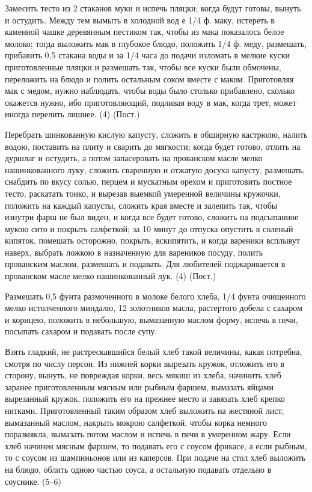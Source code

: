 
Замесить тесто из 2 стаканов муки и испечь пляцки; когда будут готовы, вынуть и остудить. Между тем вымыть в холодной вод е 1/4 ф. маку, истереть в каменной чашке деревянным пестиком так, чтобы из мака показалось белое молоко; тогда выложить мак в глубокое блюдо, положить 1/4 ф. меду, размешать, прибавить 0,5 стакана воды и за 1/4 часа до подачи изломать в мелкие куски приготовленные пляцки и размешать так, чтобы все куски были обмочены, переложить на блюдо и полить остальным соком вместе с маком. Приготовляя мак с медом, нужно наблюдать, чтобы воды было столько прибавлено, сколько окажется нужно, ибо приготовляющий, подливая воду в мак, когда трет, может иногда перелить лишнее. (4) (Пост.) 


Перебрать шинкованную кислую капусту, сложить в обширную кастрюлю, налить водою, поставить на плиту и сварить до мягкости; когда будет готово, отлить на дуршлаг и остудить, а потом запасеровать на прованском масле мелко нашинкованного луку, сложить сваренную и отжатую досуха капусту, размешать, снабдить по вкусу солью, перцем и мускатным орехом и приготовить постное тесто, раскатать тонко, и вырезав выемкой умеренной величины кружочки, положить на каждый капусты, сложить края вместе и залепить так, чтобы изнутри фарш не был виден, и когда все будет готово, сложить на подсыпанное мукою сито и покрыть салфеткой; за 10 минут до отпуска опустить в соленый кипяток, помешать осторожно, покрыть, вскипятить, и когда вареники всплывут наверх, выбрать ложкою в назначенную для вареников посуду, полить прованским маслом, размешать и подавать. Для любителей поджаривается в прованском масле мелко нашинкованный лук. (4) (Пост.) 


Размешать 0,5 фунта размоченного в молоке белого хлеба, 1/4 фунта очищенного мелко истолченного миндалю, 12 золотников масла, растертого добела с сахаром и корицею, положить в небольшую, вымазанную маслом форму, испечь в печи, посыпать сахаром и подавать после супу. 


Взять гладкий, не растрескавшийся белый хлеб такой величины, какая потребна, смотря по числу персон. Из нижней корки вырезать кружок, отложить его в сторону, вынуть, не повреждая корки, весь мякиш из хлеба, начинить хлеб заранее приготовленным мясным или рыбным фаршем, вымазать яйцами вырезанный кружок, положить его на прежнее место и завязать хлеб крепко нитками. Приготовленный таким образом хлеб выложить на жестяной лист, вымазанный маслом, накрыть мокрою салфеткой, чтобы корка немного поразмякла, вымазать потом маслом и испечь в печи в умеренном жару. Если хлеб начинен мясным фаршем, то подавать его с соусом фрикасе, а если рыбным, то с соусом из шампиньонов или из каперсов. При подаче на стол хлеб выложить на блюдо, облить одною частью соуса, а остальную подавать отдельно в соуснике. (5--6) 


